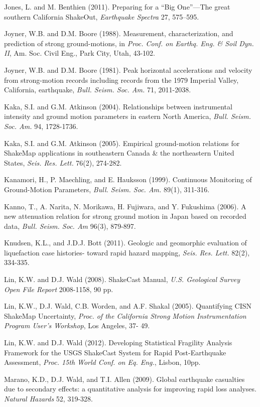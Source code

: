 \documentclass[letterpaper,10pt,english]{sphinxmanual}
\begin{document}
\label{references:jones2011}
Jones, L. and M. Benthien (2011). Preparing for a “Big One”—The great
southern California ShakeOut, \emph{Earthquake Spectra} 27, 575–595.

Joyner, W.B. and D.M. Boore (1988). Measurement, characterization, and prediction of
strong ground-motions, in \emph{Proc. Conf. on Earthq. Eng. \& Soil Dyn. II}, Am. Soc. Civil Eng., Park City, Utah, 43-102.

Joyner, W.B. and D.M. Boore (1981). Peak horizontal accelerations and velocity from
strong-motion records including records from the 1979 Imperial Valley, California,
earthquake, \emph{Bull. Seism. Soc. Am.} 71, 2011-2038.

Kaka, S.I. and G.M. Atkinson (2004). Relationships between instrumental intensity and
ground motion parameters in eastern North America, \emph{Bull. Seism. Soc. Am.} 94, 1728-1736.

Kaka, S.I. and G.M. Atkinson (2005). Empirical ground-motion relations for ShakeMap
applications in southeastern Canada \& the northeastern United States,
\emph{Seis. Res. Lett.} 76(2), 274-282.

\label{references:kanamori1999}
Kanamori, H., P. Maechling, and E. Hauksson (1999). Continuous Monitoring of Ground-Motion
Parameters, \emph{Bull. Seism. Soc. Am.} 89(1), 311-316.

Kanno, T., A. Narita, N. Morikawa, H. Fujiwara, and Y. Fukushima (2006). A new attenuation relation for
strong ground motion in Japan based on recorded data, \emph{Bull. Seism. Soc. Am} 96(3), 879-897.

\label{references:knudsen2011}
Knudsen, K.L., and J.D.J. Bott (2011). Geologic and geomorphic evaluation of liquefaction
case histories- toward rapid hazard mapping, \emph{Seis. Res. Lett.} 82(2), 334-335.

Lin, K.W. and D.J. Wald (2008). ShakeCast Manual, \emph{U.S. Geological Survey Open File Report}
2008-1158, 90 pp.

Lin, K.W., D.J. Wald,  C.B. Worden, and A.F. Shakal (2005). Quantifying CISN ShakeMap Uncertainty,
\emph{Proc. of the California Strong Motion Instrumentation Program User's Workshop}, Los Angeles, 37-
49.

Lin, K.W. and D.J. Wald (2012). Developing Statistical Fragility Analysis Framework for the USGS
ShakeCast System for Rapid Post-Earthquake Assessment, \emph{Proc. 15th World Conf. on Eq. Eng.},
Lisbon, 10pp.

Marano, K.D., D.J. Wald, and T.I. Allen (2009). Global earthquake casualties due to
secondary effects: a quantitative analysis for improving rapid loss analyses. \emph{Natural
Hazards} 52, 319-328.
\end{document}
